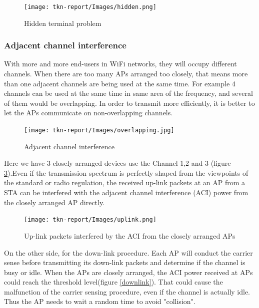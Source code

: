 \documentclass{IEEEtran}
\begin{document}
\graphicspath{{Images/}}
\maketitle
\begin{figure}[htp]
\centering
\texttt{[image: tkn-report/Images/hidden.png]}
\caption{Hidden terminal problem}
\label{hidden}
\end{figure}

\subsubsection{Adjacent channel interference}
With more and more end-users in WiFi networks, they will occupy different channels. When there are too many APs arranged too closely, that means more than one adjacent channels are being used at the same time. For example 4 channels can be used at the same time in same area of the frequency, and several of them would be overlapping. In order to transmit more efficiently, it is better to let the APs communicate on non-overlapping channels.


\graphicspath{{Images/}}
\maketitle
\begin{figure}[htp]
\centering
\texttt{[image: tkn-report/Images/overlapping.jpg]}
\caption{Adjacent channel interference}
\label{ACI}
\end{figure}

Here we have 3 closely arranged devices use the Channel 1,2 and 3 (figure \ref{uplink}).Even if the transmission spectrum is perfectly shaped from the viewpoints of the standard or radio regulation, the received up-link packets at an AP from a STA can be interfered with the adjacent channel interference (ACI) power from the closely arranged AP directly.\cite{Shoji2014}

\graphicspath{{Images/}}
\maketitle
\begin{figure}[htp]
\centering
\texttt{[image: tkn-report/Images/uplink.png]}
\caption{Up-link packets interfered by the ACI from the closely arranged APs
}
\label{uplink}
\end{figure}
 
 On the other side, for the down-link procedure. Each AP will conduct the carrier sense before transmitting its down-link packets and determine if the channel is busy or idle. When the APs are closely arranged, the ACI power received at APs could reach the threshold level(figure \ref{downlink}). That could cause the malfunction of the carrier sensing procedure, even if the channel is actually idle. Thus the AP needs to wait a random time to avoid "collision". 
\end{document}
